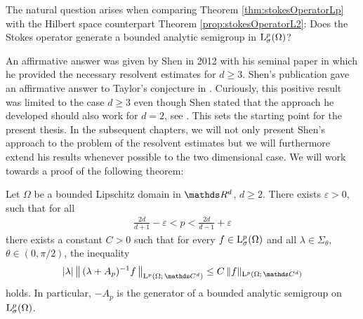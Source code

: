 The natural question arises when comparing Theorem \ref{thm:stokesOperatorLp} with the Hilbert space counterpart Theorem \ref{prop:stokesOperatorL2}: Does the Stokes operator generate a bounded analytic semigroup in $\mathrm{L}^p_\sigma(\Omega)$?

An affirmative answer was given by Shen in 2012 with his seminal paper \cite{Shen2012} in which he provided the necessary resolvent estimates for $d \geq 3$.
Shen's publication gave an affirmative answer to Taylor's conjecture in \cite{taylor}. 
Curiously, this positive result was limited to the case $d \geq 3$ even though Shen stated that the approach he developed should also work for $d = 2$, see \cite[p.\@~399]{Shen2012}.
This sets the starting point for the present thesis.
In the subsequent chapters, we will not only present Shen's approach to the problem of the resolvent estimates but we will furthermore extend his results whenever possible to the two dimensional case.
We will work towards a proof of the following theorem:

\begin{thm}
  \label{thm:main}
  Let $\Omega$ be a bounded Lipschitz domain in $\R^d$, $d \geq 2$.
  There exists $\varepsilon > 0$, such that for all
  \begin{align*}
    \frac{2d}{d + 1} - \varepsilon < p < \frac{2d}{d - 1} + \varepsilon
  \end{align*}
  there exists a constant $C > 0$ such that for every $f \in \mathrm{L}^p_\sigma(\Omega)$ and all $\lambda \in \Sigma_\theta$, $\theta \in (0,\pi/2)$, the inequality
  \begin{align*}
    |\lambda|\, \big\| \, (\lambda + A_p)^{-1} f\, \big\|_{\Ell^p(\Omega; \,\C^d)} 
    \leq C\, \|f\|_{\Ell^p(\Omega;\, \C^d)}
  \end{align*}
  holds. In particular, $-A_p$ is the generator of a bounded analytic semigroup on $\mathrm{L}^p_\sigma(\Omega)$.
\end{thm}

